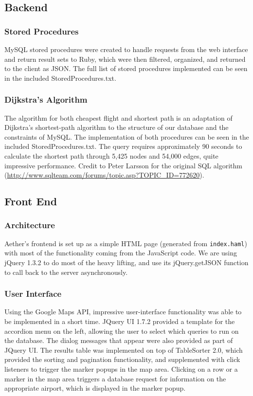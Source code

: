 \subsection{Backend}

\subsubsection{Stored Procedures}
MySQL stored procedures were created to handle requests from the web interface and return result sets to Ruby, which were then filtered, organized, and returned to the client as JSON. The full list of stored procedures implemented can be seen in the included StoredProcedures.txt.

\subsubsection{Dijkstra's Algorithm}
The algorithm for both cheapest flight and shortest path is an adaptation of Dijkstra's shortest-path algorithm to the structure of our database and the constraints of MySQL. The implementation of both procedures can be seen in the included StoredProcedures.txt.  The query requires approximately 90 seconds to calculate the shortest path through 5,425 nodes and 54,000 edges, quite impressive performance. Credit to Peter Larsson for the original SQL algorithm (\mbox{\url{http://www.sqlteam.com/forums/topic.asp?TOPIC_ID=772620}}).

\subsection{Front End}
\subsubsection{Architecture}
Aether's frontend is set up as a simple HTML page (generated from \verb!index.haml!) with most of the functionality coming from the JavaScript code. We are using jQuery 1.3.2 to do most of the heavy lifting, and use its jQuery.getJSON function to call back to the server asynchronously.

\subsubsection{User Interface}
Using the Google Maps API, impressive user-interface functionality was able to be implemented in a short time. JQuery UI 1.7.2 provided a template for the accordion menu on the left, allowing the user to select which queries to run on the database. The dialog messages that appear were also provided as part of JQuery UI. The results table was implemented on top of TableSorter 2.0, which provided the sorting and pagination functionality, and supplemented with click listeners to trigger the marker popups in the map area. Clicking on a row or a marker in the map area triggers a database request for information on the appropriate airport, which is displayed in the marker popup.


